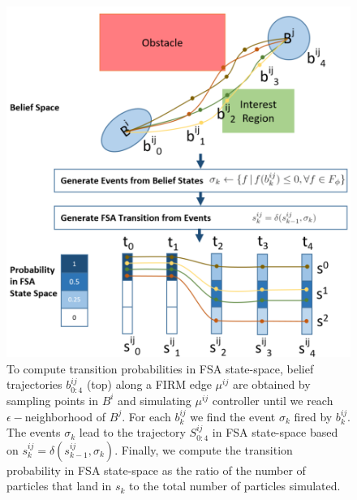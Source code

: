 \documentclass[letterpaper]{article} %
\begin{document}
\begin{figure}[h!]
	\centering
	\includegraphics[width=.8\columnwidth]{figs/BeliefRabinTransitionV3.png}
	\caption{To compute transition probabilities in FSA state-space, belief trajectories $b^{ij}_{0:4}$ (top) along a FIRM edge $\mu^{ij}$ are obtained by sampling points in $B^i$ and simulating $\mu^{ij}$ controller until we reach $\epsilon-$neighborhood of $B^j$. For each $b^{ij}_k$ we find the event $\sigma_k$ fired by $b^{ij}_k$. The events $\sigma_k$ lead to the trajectory $S^{ij}_{0:4}$ in FSA state-space based on $s^{ij}_k = \delta(s^{ij}_{k-1},\sigma_k)$. Finally, we compute the transition probability in FSA state-space as the ratio of the number of particles that land in $s_k$ to the total number of particles simulated.}
	\label{fig:TransProb}
\end{figure}

\end{document}
